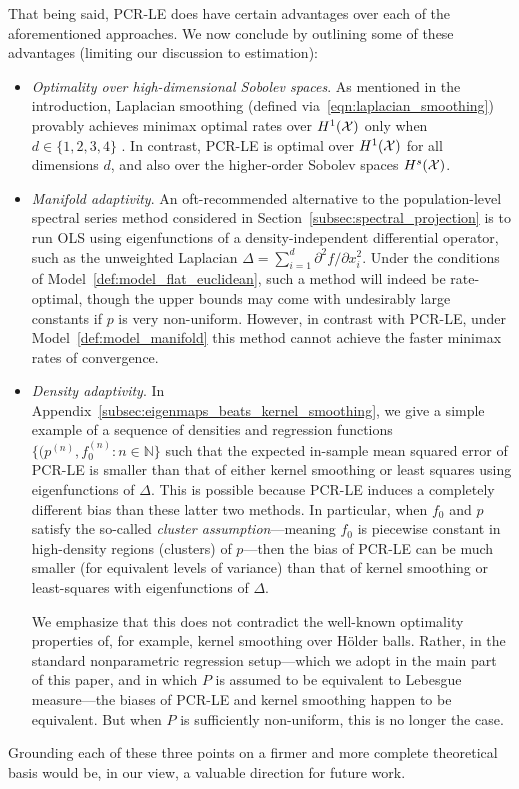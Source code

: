That being said, PCR-LE does have certain advantages over each of the aforementioned approaches. We now conclude by outlining some of these advantages (limiting our discussion to estimation):
\begin{itemize}
	\item \emph{Optimality over high-dimensional Sobolev spaces}. As mentioned in the introduction, Laplacian smoothing (defined via~\eqref{eqn:laplacian_smoothing}) provably achieves minimax optimal rates over $H^1(\mathcal{X})$ only when $d \in \{1,2,3,4\}$ \citep{sadhanala16, green2021}. In contrast, PCR-LE is optimal over $H^1(\mathcal{X})$ for all dimensions $d$, and also over the higher-order Sobolev spaces $H^s(\mathcal{X})$. 
	\item \emph{Manifold adaptivity}. An oft-recommended alternative to the population-level spectral series method considered in Section~\ref{subsec:spectral_projection} is to run OLS using eigenfunctions of a density-independent differential operator, such as the unweighted Laplacian $\Delta = \sum_{i = 1}^{d} \partial^2f/\partial x_i^2$. Under the conditions of Model~\ref{def:model_flat_euclidean}, such a method will indeed be rate-optimal, though the upper bounds may come with undesirably large constants if $p$ is very non-uniform. However, in contrast with PCR-LE, under Model~\ref{def:model_manifold} this method cannot achieve the faster minimax rates of convergence.
	\item \emph{Density adaptivity}. In Appendix~\ref{subsec:eigenmaps_beats_kernel_smoothing}, we give a simple example of a sequence of densities and regression functions $\{(p^{(n)}, f_0^{(n)}: n \in \mathbb{N}\}$ such that the expected in-sample mean squared error of PCR-LE is smaller than that of either kernel smoothing or least squares using eigenfunctions of $\Delta$. This is possible because PCR-LE induces a completely different bias than these latter two methods. In particular, when $f_0$ and $p$ satisfy the so-called \emph{cluster assumption}---meaning $f_0$ is piecewise constant in high-density regions (clusters) of $p$---then the bias of PCR-LE can be much smaller (for equivalent levels of variance) than that of kernel smoothing or least-squares with eigenfunctions of $\Delta$. 
	
	We emphasize that this does not contradict the well-known optimality properties of, for example, kernel smoothing over H\"{o}lder balls. Rather, in the standard nonparametric regression setup---which we adopt in the main part of this paper, and in which $P$ is assumed to be equivalent to Lebesgue measure---the biases of PCR-LE and kernel smoothing happen to be equivalent. But when $P$ is sufficiently non-uniform, this is no longer the case.
\end{itemize}
Grounding each of these three points on a firmer and more complete theoretical basis would be, in our view, a valuable direction for future work.